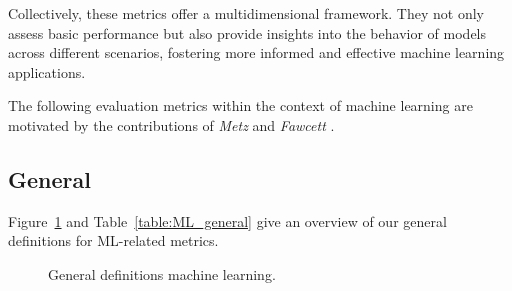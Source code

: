 \documentclass{article}
\begin{document}
Collectively, these metrics offer a multidimensional framework. They not only assess basic performance but also provide insights into the behavior of models across different scenarios, fostering more informed and effective machine learning applications.

The following evaluation metrics within the context of machine learning are motivated by the contributions of \textit{Metz} \cite{metz1978basic} and \textit{Fawcett} \cite{fawcett2006introduction}.


\subsection{General}

Figure~\ref{figure:ML_general} and Table~\ref{table:ML_general} give an overview of our general definitions for ML-related metrics.

\begin{figure}[H]
    \centering


    \caption{General definitions machine learning.}
    \label{figure:ML_general}
\end{figure}
\end{document}
